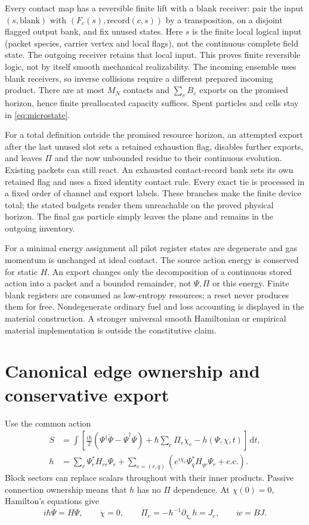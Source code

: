 \documentclass[11pt]{article}
\theoremstyle{definition}\newtheorem{definition}[theorem]{Definition}
\theoremstyle{remark}\newtheorem{remark}[theorem]{Remark}
\newcommand{\dd}{\,\mathrm d}\newcommand{\Var}{\operatorname{Var}}
\begin{document}
Every contact map has a reversible finite lift with a blank receiver: pair the input $(s,\mathrm{blank})$ with $(F_c(s),\mathrm{record}(c,s))$ by a transposition, on a disjoint flagged output bank, and fix unused states. Here $s$ is the finite local logical input (packet species, carrier vertex and local flags), not the continuous complete field state. The outgoing receiver retains that local input. This proves finite reversible logic, not by itself smooth mechanical realizability. The incoming ensemble uses blank receivers, so inverse collisions require a different prepared incoming product. There are at most $M_N$ contacts and $\sum_e B_e$ exports on the promised horizon, hence finite preallocated capacity suffices. Spent particles and cells stay in \eqref{eq:microstate}.

For a total definition outside the promised resource horizon, an attempted export after the last unused slot sets a retained exhaustion flag, disables further exports, and leaves $\Pi$ and the now unbounded residue to their continuous evolution. Existing packets can still react. An exhausted contact-record bank sets its own retained flag and uses a fixed identity contact rule. Every exact tie is processed in a fixed order of channel and export labels. These branches make the finite device total; the stated budgets render them unreachable on the proved physical horizon. The final gas particle simply leaves the plane and remains in the outgoing inventory.

For a minimal energy assignment all pilot register states are degenerate and gas momentum is unchanged at ideal contact. The source action energy is conserved for static $H$. An export changes only the decomposition of a continuous stored action into a packet and a bounded remainder, not $\Psi,\Pi$ or this energy. Finite blank registers are consumed as low-entropy resources; a reset never produces them for free. Nondegenerate ordinary fuel and loss accounting is displayed in the material construction. A stronger universal smooth Hamiltonian or empirical material implementation is outside the constitutive claim.

\section{Canonical edge ownership and conservative export}\label{sec:source}
Use the common action
\begin{align}
 S&=\int\left[\frac{i\hbar}{2}(\Psi^\dagger\dot\Psi-\dot\Psi^\dagger\Psi)
       +\hbar\sum_e\Pi_e\dot\chi_e-h(\Psi,\chi,t)\right]\dd t,\\
 h&=\sum_r\Psi_r^*H_{rr}\Psi_r+
    \sum_{e=(r,q)}\left(e^{i\chi_e}\Psi_q^*H_{qr}\Psi_r+\mathrm{c.c.}\right).
 \label{eq:action}
\end{align}
Block sectors can replace scalars throughout with their inner products. Passive connection ownership means that $h$ has no $\Pi$ dependence. At $\chi(0)=0$, Hamilton's equations give
\begin{equation}
 i\hbar\dot\Psi=H\Psi,\qquad \dot\chi=0,\qquad
 \dot\Pi_e=-\hbar^{-1}\partial_{\chi_e}h=J_e,\qquad \dot w=BJ.
 \label{eq:ownership}
\end{equation}
\end{document}
